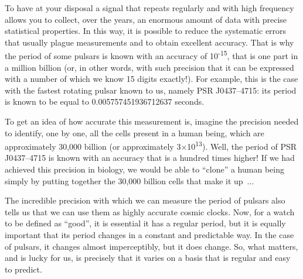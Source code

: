 To have at your disposal a signal that repeats regularly and with high frequency allows
you to collect, over the years, an enormous amount of data with precise statistical
properties. In this way, it is possible to reduce the systematic errors that usually
plague measurements and to obtain excellent accuracy. That is why the period of some
pulsars is known with an accuracy of 10\textsuperscript{-15}, that is
one part in a million billion (or, in other words, with such precision that it can be
expressed with a number of which we know 15 digits exactly!). For example, this is the
case with the fastest rotating pulsar known to us, namely PSR
J0437--4715: its period is known to be equal to 0.005757451936712637
seconds.

To get an idea of how accurate this measurement is, imagine the precision needed to
identify, one by one, all the cells present in a human being, which are approximately
30,000 billion (or approximately 3×10\textsuperscript{13}). Well, the period of PSR
J0437--4715 is known with an accuracy that is a hundred times higher!
If we had achieved this precision in biology, we would be able to ``clone'' a human
being simply by putting together the 30,000 billion cells that make it up~...

The incredible precision with which we can measure the period of pulsars also tells us
that we can use them as highly accurate cosmic clocks. Now, for a watch to be defined as
``good'', it is essential it has a regular period, but it is equally important that its
period changes in a constant and predictable way. In the case of pulsars, it changes
almost imperceptibly, but it does change. So, what matters, and is lucky for us, is
precisely that it varies on a basis that is regular and easy to predict.


